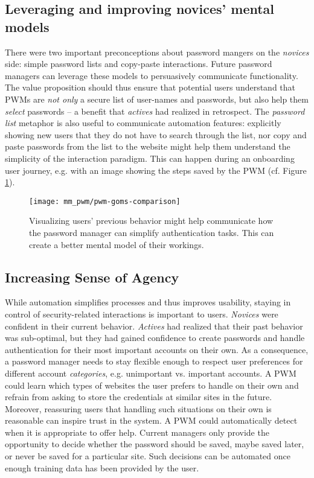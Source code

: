 \subsection{Leveraging and improving novices' mental models}
There were two important preconceptions about password mangers on the \textit{novices} side: simple password lists and copy-paste interactions. Future password managers can leverage these models to persuasively communicate functionality. The value proposition should thus ensure that potential users understand that PWMs are \textit{not only} a secure list of user-names and passwords, but also help them \textit{select} passwords -- a benefit that \textit{actives} had realized in retrospect. The \textit{password list} metaphor is also useful to communicate automation features: explicitly showing new users that they do not have to search through the list, nor copy and paste passwords from the list to the website might help them understand the simplicity of the interaction paradigm. This can happen during an onboarding user journey, e.g. with an image showing the steps saved by the PWM (cf. Figure \ref{fig:mm_pwm:pwm-goms-comparison}).

\begin{figure}%
	\centering
	\texttt{[image: mm\_pwm/pwm-goms-comparison]}
	\caption{\label{fig:mm_pwm:pwm-goms-comparison} Visualizing users' previous behavior might help communicate how the password manager can simplify authentication tasks. This can create a better mental model of their workings.}
\end{figure}


\subsection{Increasing Sense of Agency}
While automation simplifies processes and thus improves usability, staying in control of security-related interactions is important to users. \textit{Novices} were confident in their current behavior. \textit{Actives} had realized that their past behavior was sub-optimal, but they had gained confidence to create passwords and handle authentication for their most important accounts on their own. As a consequence, a password manager needs to stay flexible enough to respect user preferences for different account \textit{categories}, e.g. unimportant vs. important accounts. A PWM could learn which types of websites the user prefers to handle on their own and refrain from asking to store the credentials at similar sites in the future. Moreover, reassuring users that handling such situations on their own is reasonable can inspire trust in the system. A PWM could automatically detect when it is appropriate to offer help. Current managers only provide the opportunity to decide whether the password should be saved, maybe saved later, or never be saved for a particular site. Such decisions can be automated once enough training data has been provided by the user.

